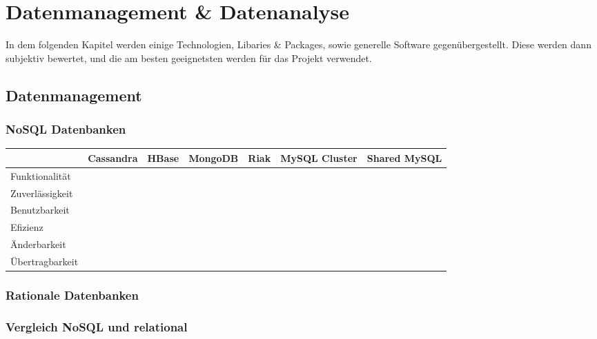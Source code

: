 \chapter{Datenmanagement \& Datenanalyse}

In dem folgenden Kapitel werden einige Technologien, Libaries & Packages, sowie generelle Software gegenübergestellt. Diese werden dann subjektiv bewertet, und die am besten geeignetsten werden für das Projekt verwendet.

\section{Datenmanagement}

\subsection{NoSQL Datenbanken}

\begin{tabular} {| l | c | c | c | c | c | c |}
	\hline
	 & Cassandra & HBase & MongoDB & Riak & MySQL Cluster & Shared MySQL		\\ \hline \hline
	Funktionalität &  &	 &  &  &  &  &		\\ \hline
	Zuverlässigkeit &  &	 &  &  &  &  &	 			\\ \hline
	Benutzbarkeit &  &	 &  &  &  &  &	 		\\ \hline
	Efizienz &  &	 &  &  &  &  &			\\ \hline
	Änderbarkeit &  &  &  &  &  &  &		\\ \hline 
	Übertragbarkeit	&  &	&  &  &  &  &					\\ \hline
\end{tabular}

\subsection{Rationale Datenbanken}


\subsection{Vergleich NoSQL und relational}

